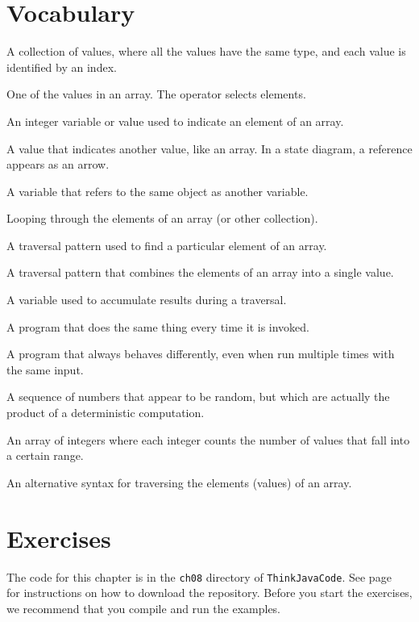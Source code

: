 \section{Vocabulary}

\begin{description}

A collection of values, where all the values have the same type, and each value is identified by an index.

One of the values in an array.
The \java{[]} operator selects elements.

An integer variable or value used to indicate an element of an array.

A value that indicates another value, like an array.
In a state diagram, a reference appears as an arrow.

A variable that refers to the same object as another variable.

Looping through the elements of an array (or other collection).

A traversal pattern used to find a particular element of an array.

A traversal pattern that combines the elements of an array into a single value.

A variable used to accumulate results during a traversal.

A program that does the same thing every time it is invoked.

A program that always behaves differently, even when run multiple times with the same input.

A sequence of numbers that appear to be random, but which are actually the product of a deterministic computation.

An array of integers where each integer counts the number of values that fall into a certain range.

An alternative syntax for traversing the elements (values) of an array.

\end{description}


\section{Exercises}

The code for this chapter is in the {\tt ch08} directory of {\tt ThinkJavaCode}.
See page~\pageref{code} for instructions on how to download the repository.
Before you start the exercises, we recommend that you compile and run the examples.

